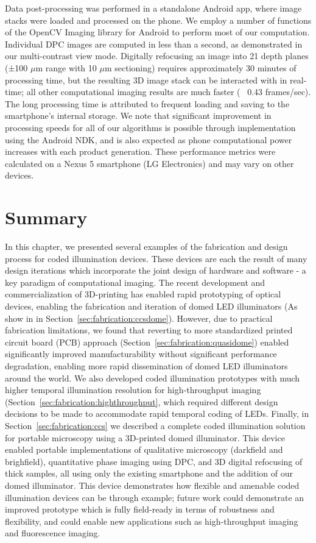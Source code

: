 Data post-processing was performed in a standalone Android app, where image stacks were loaded and processed on the phone. We employ a number of functions of the OpenCV Imaging library for Android to perform most of our computation. Individual DPC images are computed in less than a second, as demonstrated in our multi-contrast view mode. Digitally refocusing an image into 21 depth planes (±100 $\mu$m range with 10 $\mu$m sectioning) requires approximately 30 minutes of processing time, but the resulting 3D image stack can be interacted with in real-time; all other computational imaging results are much faster (~ 0.43 frames/sec). The long processing time is attributed to frequent loading and saving to the smartphone’s internal storage. We note that significant improvement in processing speeds for all of our algorithms is possible through implementation using the Android NDK, and is also expected as phone computational power increases with each product generation. These performance metrics were calculated on a Nexus 5 smartphone (LG Electronics) and may vary on other devices.

\section{Summary}
In this chapter, we presented several examples of the fabrication and design process for coded illumination devices. These devices are each the result of many design iterations which incorporate the joint design of hardware and software - a key paradigm of computational imaging. The recent development and commercialization of 3D-printing has enabled rapid prototyping of optical devices, enabling the fabrication and iteration of domed LED illuminators (As show in in Section~\ref{sec:fabrication:ccsdome}). However, due to practical fabrication limitations, we found that reverting to more standardized printed circuit board (PCB) approach (Section~\ref{sec:fabrication:quasidome}) enabled significantly improved manufacturability without significant performance degradation, enabling more rapid dissemination of domed LED illuminators around the world. We also developed coded illumination prototypes with much higher temporal illumination resolution for high-throughput imaging (Section~\ref{sec:fabrication:highthroughput}, which required different design decisions to be made to accommodate rapid temporal coding of LEDs. Finally, in Section~\ref{sec:fabrication:ccs} we described a complete coded illumination solution for portable microscopy using a 3D-printed domed illuminator. This device enabled portable implementations of qualitative microscopy (darkfield and brighfield), quantitative phase imaging using DPC, and 3D digital refocusing of thick samples, all using only the existing smartphone and the addition of our domed illuminator. This device demonstrates how flexible and amenable coded illumination devices can be through example; future work could demonstrate an improved prototype which is fully field-ready in terms of robustness and flexibility, and could enable new applications such as high-throughput imaging and fluorescence imaging.